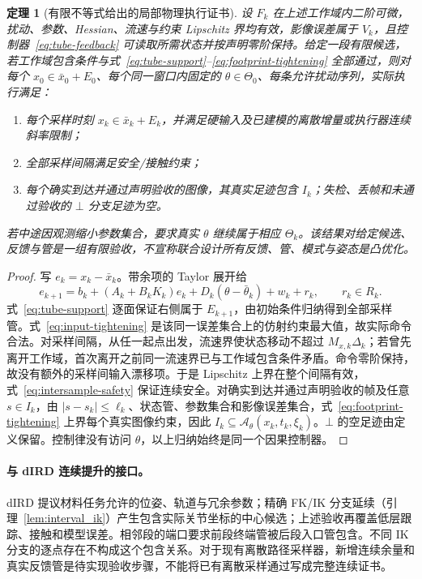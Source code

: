\documentclass[UTF8,fontset=fandol,zihao=5,a4paper]{ctexart}
\newtheorem{theorem}{定理}[section]
\theoremstyle{definition}
\theoremstyle{remark}\newtheorem{remark}[theorem]{说明}
\numberwithin{equation}{section}
\begin{document}
\begin{theorem}[有限不等式给出的局部物理执行证书]
\label{thm:local-physical-tube}
设 \(F_k\) 在上述工作域内二阶可微，扰动、参数、Hessian、流速与约束 Lipschitz 界均有效，影像误差属于 \(V_k\)，且控制器~\eqref{eq:tube-feedback} 可读取所需状态并按声明零阶保持。给定一段有限候选，若工作域包含条件与式~\eqref{eq:tube-support}--\eqref{eq:footprint-tightening} 全部通过，则对每个
\(x_0\in\bar x_0+E_0\)、每个同一窗口内固定的 \(\theta\in\Theta_0\)、每条允许扰动序列，实际执行满足：
\begin{enumerate}
\item 每个采样时刻 \(x_k\in\bar x_k+E_k\)，并满足硬输入及已建模的离散增量或执行器连续斜率限制；
\item 全部采样间隔满足安全/接触约束；
\item 每个确实到达并通过声明验收的图像，其真实足迹包含 \(I_k\)；失检、丢帧和未通过验收的 \(\bot\) 分支足迹为空。
\end{enumerate}
若中途因观测缩小参数集合，要求真实 \(\theta\) 继续属于相应 \(\Theta_k\)。该结果对给定候选、反馈与管是一组有限验收，不宣称联合设计所有反馈、管、模式与姿态是凸优化。
\end{theorem}
\begin{proof}
写 \(e_k=x_k-\bar x_k\)。带余项的 Taylor 展开给
\[
e_{k+1}=b_k+(A_k+B_kK_k)e_k+D_k(\theta-\bar\theta_k)+w_k+r_k,
\qquad r_k\in R_k.
\]
式~\eqref{eq:tube-support} 逐面保证右侧属于 \(E_{k+1}\)，由初始条件归纳得到全部采样管。式~\eqref{eq:input-tightening} 是该同一误差集合上的仿射约束最大值，故实际命令合法。对采样间隔，从任一起点出发，流速界使状态移动不超过 \(M_{x,k}\Delta_k\)；若曾先离开工作域，首次离开之前同一流速界已与工作域包含条件矛盾。命令零阶保持，故没有额外的采样间输入漂移项。于是 Lipschitz 上界在整个间隔有效，式~\eqref{eq:intersample-safety} 保证连续安全。对确实到达并通过声明验收的帧及任意 \(s\in I_k\)，由 \(|s-s_k|\le\ell_k\)、状态管、参数集合和影像误差集合，式~\eqref{eq:footprint-tightening} 上界每个真实图像约束，因此 \(I_k\subseteq\mathcal A_\theta(x_k,t_k,\xi_k)\)。\(\bot\) 的空足迹由定义保留。控制律没有访问 \(\theta\)，以上归纳始终是同一个因果控制器。
\end{proof}

\paragraph{与 dIRD 连续提升的接口。}
dIRD 提议材料任务允许的位姿、轨道与冗余参数；精确 FK/IK 分支延续（引理~\ref{lem:interval_ik}）产生包含实际关节坐标的中心候选；上述验收再覆盖低层跟踪、接触和模型误差。相邻段的端口要求前段终端管被后段入口管包含。不同 IK 分支的逐点存在不构成这个包含关系。对于现有离散路径采样器，新增连续余量和真实反馈管是待实现验收步骤，不能将已有离散采样通过写成完整连续证书。
\end{document}
